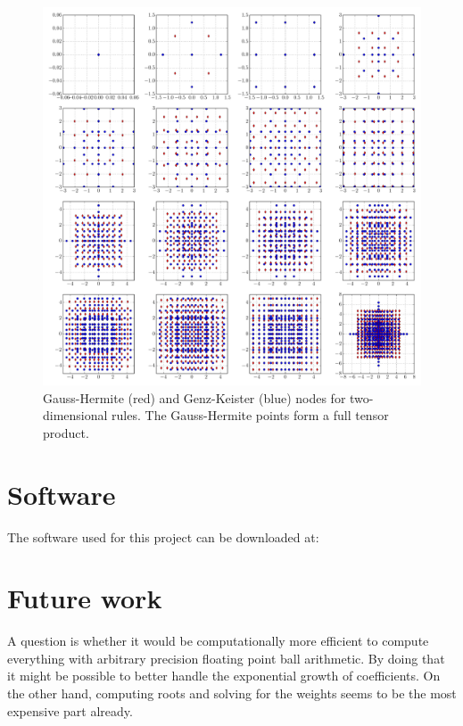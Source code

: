 \documentclass[a4paper,10pt]{article}
\begin{document}
\begin{figure}[h]
  \centering
  \includegraphics[width=\linewidth]{./img/gk_hermitephy_nodes_2d.pdf}
  \caption{Gauss-Hermite (red) and Genz-Keister (blue) nodes for
  two-dimensional rules. The Gauss-Hermite points form a full tensor
  product.}
  \label{fig:gk_hermitephy_nodes_2d}
\end{figure}


\FloatBarrier
\section{Software}

The software used for this project can be downloaded at:



\FloatBarrier
\section{Future work}

A question is whether it would be computationally more efficient to compute
everything with arbitrary precision floating point ball arithmetic. By doing that
it might be possible to better handle the exponential growth of coefficients.
On the other hand, computing roots and solving for the weights seems to be
the most expensive part already.
\end{document}

